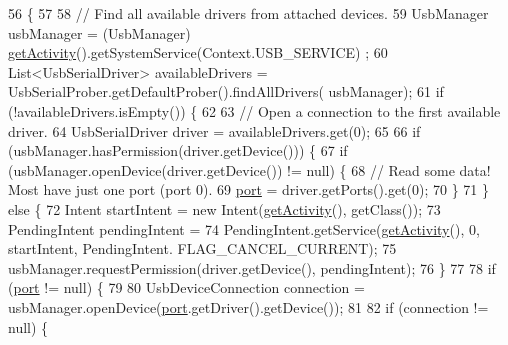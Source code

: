 \begin{DoxyCode}
56                                  \{
57 
58         \textcolor{comment}{// Find all available drivers from attached devices.}
59         UsbManager usbManager = (UsbManager) \hyperlink{classit_1_1unibo_1_1torsello_1_1bluetoothpositioning_1_1util_1_1UsbUtil_a625b1885830a4d2c359a534834a46648_a625b1885830a4d2c359a534834a46648}{getActivity}().getSystemService(Context.USB\_SERVICE)
      ;
60         List<UsbSerialDriver> availableDrivers = UsbSerialProber.getDefaultProber().findAllDrivers(
      usbManager);
61         \textcolor{keywordflow}{if} (!availableDrivers.isEmpty()) \{
62 
63             \textcolor{comment}{// Open a connection to the first available driver.}
64             UsbSerialDriver driver = availableDrivers.get(0);
65 
66             \textcolor{keywordflow}{if} (usbManager.hasPermission(driver.getDevice())) \{
67                 \textcolor{keywordflow}{if} (usbManager.openDevice(driver.getDevice()) != null) \{
68                     \textcolor{comment}{// Read some data! Most have just one port (port 0).}
69                     \hyperlink{classit_1_1unibo_1_1torsello_1_1bluetoothpositioning_1_1util_1_1UsbUtil_a49aef08510b6d48d627670d834099c36_a49aef08510b6d48d627670d834099c36}{port} = driver.getPorts().get(0);
70                 \}
71             \} \textcolor{keywordflow}{else} \{
72                 Intent startIntent = \textcolor{keyword}{new} Intent(\hyperlink{classit_1_1unibo_1_1torsello_1_1bluetoothpositioning_1_1util_1_1UsbUtil_a625b1885830a4d2c359a534834a46648_a625b1885830a4d2c359a534834a46648}{getActivity}(), getClass());
73                 PendingIntent pendingIntent =
74                         PendingIntent.getService(\hyperlink{classit_1_1unibo_1_1torsello_1_1bluetoothpositioning_1_1util_1_1UsbUtil_a625b1885830a4d2c359a534834a46648_a625b1885830a4d2c359a534834a46648}{getActivity}(), 0, startIntent, PendingIntent.
      FLAG\_CANCEL\_CURRENT);
75                 usbManager.requestPermission(driver.getDevice(), pendingIntent);
76             \}
77 
78             \textcolor{keywordflow}{if} (\hyperlink{classit_1_1unibo_1_1torsello_1_1bluetoothpositioning_1_1util_1_1UsbUtil_a49aef08510b6d48d627670d834099c36_a49aef08510b6d48d627670d834099c36}{port} != null) \{
79 
80                 UsbDeviceConnection connection = usbManager.openDevice(\hyperlink{classit_1_1unibo_1_1torsello_1_1bluetoothpositioning_1_1util_1_1UsbUtil_a49aef08510b6d48d627670d834099c36_a49aef08510b6d48d627670d834099c36}{port}.getDriver().getDevice());
81 
82                 \textcolor{keywordflow}{if} (connection != null) \{

\end{DoxyCode}
